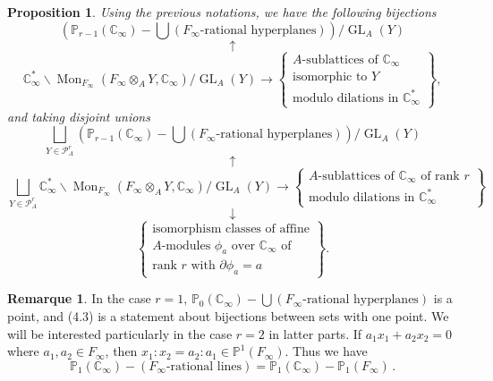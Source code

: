 \documentclass[12pt,a4paper]{article}
\theoremstyle{plain}
\newtheorem{proposition}{Proposition}[section]
\theoremstyle{definition}
\newtheorem{remark}{Remarque}[section]
\theoremstyle{remark}
\DeclareMathOperator{\Mon}{Mon}
\DeclareMathOperator{\GL}{GL}
\begin{document}
\begin{proposition}
Using the previous notations, we have the following bijections
\[
(\mathbb{P}_{r-1}(\mathbb{C}_\infty) - \bigcup(\text{$F_\infty$-rational hyperplanes}))/\GL_A(Y)
\]
\[
\uparrow
\]
\[
\mathbb{C}_\infty^* \backslash \Mon_{F_\infty}(F_\infty \otimes_A Y, \mathbb{C}_\infty)/\GL_A(Y) \longrightarrow \left\{\substack{\text{$A$-sublattices of $\mathbb{C}_\infty$}\\\text{isomorphic to $Y$}\\\text{modulo dilations in $\mathbb{C}_\infty^*$}}\right\},
\]
and taking disjoint unions
\[
\bigsqcup_{Y \in \mathcal{P}_A^r} (\mathbb{P}_{r-1}(\mathbb{C}_\infty) - \bigcup(\text{$F_\infty$-rational hyperplanes}))/\GL_A(Y)
\]
\[
\uparrow
\]
\[
\bigsqcup_{Y \in \mathcal{P}_A^r} \mathbb{C}_\infty^* \backslash \Mon_{F_\infty}(F_\infty \otimes_A Y, \mathbb{C}_\infty)/\GL_A(Y) \longrightarrow \left\{\substack{\text{$A$-sublattices of $\mathbb{C}_\infty$ of rank $r$}\\\text{modulo dilations in $\mathbb{C}_\infty^*$}}\right\}
\]
\[
\downarrow
\]
\[
\left\{\substack{\text{isomorphism classes of affine}\\\text{$A$-modules $\phi_a$ over $\mathbb{C}_\infty$ of}\\\text{rank $r$ with $\partial\phi_a = a$}}\right\}.
\]
\end{proposition}

\begin{remark}
In the case $r = 1$, $\mathbb{P}_0(\mathbb{C}_\infty) - \bigcup(\text{$F_\infty$-rational hyperplanes})$ 
is a point, and (4.3) is a statement about bijections between sets with one 
point. We will be interested particularly in the case $r = 2$ in latter parts. 
If $a_1 x_1 + a_2 x_2 = 0$ where $a_1, a_2 \in F_\infty$, then 
$x_1 : x_2 = a_2 : a_1 \in \mathbb{P}^1(F_\infty)$. Thus we have
\[
\mathbb{P}_1(\mathbb{C}_\infty) - (\text{$F_\infty$-rational lines}) = \mathbb{P}_1(\mathbb{C}_\infty) - \mathbb{P}_1(F_\infty) \,.
\]
\end{remark}
\end{document}
